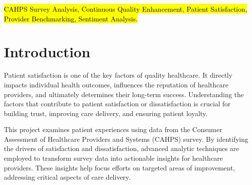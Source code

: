 \begin{IEEEkeywords}
\hl{CAHPS Survey Analysis, Continuous Quality Enhancement, Patient Satisfaction, Provider Benchmarking, Sentiment Analysis.}
\end{IEEEkeywords}






%
\IEEEpeerreviewmaketitle













\section{Introduction}

\IEEEPARstart Patient satisfaction is one of the key factors of quality healthcare. It directly impacts individual health outcomes, influences the reputation of healthcare providers, and ultimately determines their long-term success. Understanding the factors that contribute to patient satisfaction or dissatisfaction is crucial for building trust, improving care delivery, and ensuring patient loyalty.

This project examines patient experiences using data from the Consumer Assessment of Healthcare Providers and Systems (CAHPS) survey. By identifying the drivers of satisfaction and dissatisfaction, advanced analytic techniques are employed to transform survey data into actionable insights for healthcare providers. These insights help focus efforts on targeted areas of improvement, addressing critical aspects of care delivery.

